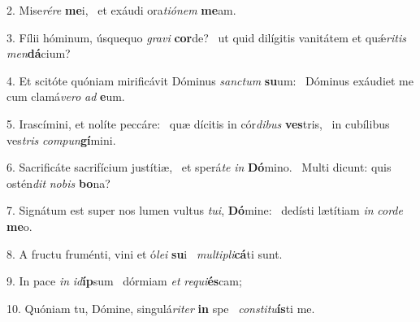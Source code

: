 2. Mise\textit{ré}\textit{re} \textbf{me}i, \ast\  et exáudi ora\textit{ti}\textit{ó}\textit{nem} \textbf{me}am.\

3. Fílii hóminum, úsquequo \textit{gra}\textit{vi} \textbf{cor}de? \ast\  ut quid dilígitis vanitátem et quǽ\textit{ri}\textit{tis} \textit{men}\textbf{dá}cium?\

4. Et scitóte quóniam mirificávit Dóminus \textit{sanc}\textit{tum} \textbf{su}um: \ast\  Dóminus exáudiet me cum clamá\textit{ve}\textit{ro} \textit{ad} \textbf{e}um.\

5. Irascímini, et nolíte peccáre: \dag\  quæ dícitis in cór\textit{di}\textit{bus} \textbf{ves}tris, \ast\  in cubílibus ves\textit{tris} \textit{com}\textit{pun}\textbf{gí}mini.\

6. Sacrificáte sacrifícium justítiæ, \dag\  et sperá\textit{te} \textit{in} \textbf{Dó}mino. \ast\  Multi dicunt: quis ostén\textit{dit} \textit{no}\textit{bis} \textbf{bo}na?\

7. Signátum est super nos lumen vultus \textit{tu}\textit{i}, \textbf{Dó}mine: \ast\  dedísti lætítiam \textit{in} \textit{cor}\textit{de} \textbf{me}o.\

8. A fructu fruménti, vini et ó\textit{le}\textit{i} \textbf{su}i \ast\  \textit{mul}\textit{ti}\textit{pli}\textbf{cá}ti sunt.\

9. In pace \textit{in} \textit{id}\textbf{íp}sum \ast\  dórmiam \textit{et} \textit{re}\textit{qui}\textbf{és}cam;\

10. Quóniam tu, Dómine, singulá\textit{ri}\textit{ter} \textbf{in} spe \ast\  \textit{con}\textit{sti}\textit{tu}\textbf{ís}ti me.\

